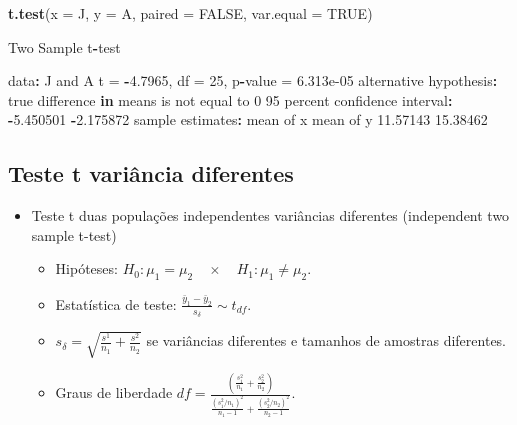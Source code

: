 \documentclass[10pt,a4paper]{book}
\newenvironment{Shaded}{\begin{snugshade}}{\end{snugshade}}
\newcommand{\KeywordTok}[1]{\textcolor[rgb]{0.13,0.29,0.53}{\textbf{#1}}}
\newcommand{\DataTypeTok}[1]{\textcolor[rgb]{0.13,0.29,0.53}{#1}}
\newcommand{\DecValTok}[1]{\textcolor[rgb]{0.00,0.00,0.81}{#1}}
\newcommand{\FloatTok}[1]{\textcolor[rgb]{0.00,0.00,0.81}{#1}}
\newcommand{\StringTok}[1]{\textcolor[rgb]{0.31,0.60,0.02}{#1}}
\newcommand{\OtherTok}[1]{\textcolor[rgb]{0.56,0.35,0.01}{#1}}
\newcommand{\ControlFlowTok}[1]{\textcolor[rgb]{0.13,0.29,0.53}{\textbf{#1}}}
\newcommand{\OperatorTok}[1]{\textcolor[rgb]{0.81,0.36,0.00}{\textbf{#1}}}
\newcommand{\NormalTok}[1]{#1}
\providecommand{\tightlist}{%
  \setlength{\itemsep}{0pt}\setlength{\parskip}{0pt}}
\begin{document}
\begin{Shaded}
\begin{Highlighting}[]
\KeywordTok{t.test}\NormalTok{(}\DataTypeTok{x =}\NormalTok{ J, }\DataTypeTok{y =}\NormalTok{ A, }\DataTypeTok{paired =} \OtherTok{FALSE}\NormalTok{, }\DataTypeTok{var.equal =} \OtherTok{TRUE}\NormalTok{)}

\NormalTok{    Two Sample t}\OperatorTok{-}\NormalTok{test}

\NormalTok{data}\OperatorTok{:}\StringTok{  }\NormalTok{J and A}
\NormalTok{t =}\StringTok{ }\OperatorTok{-}\FloatTok{4.7965}\NormalTok{, df =}\StringTok{ }\DecValTok{25}\NormalTok{, p}\OperatorTok{-}\NormalTok{value =}\StringTok{ }\FloatTok{6.313e-05}
\NormalTok{alternative hypothesis}\OperatorTok{:}\StringTok{ }\NormalTok{true difference }\ControlFlowTok{in}\NormalTok{ means is not equal to }\DecValTok{0}
\DecValTok{95}\NormalTok{ percent confidence interval}\OperatorTok{:}
\StringTok{ }\OperatorTok{-}\FloatTok{5.450501} \OperatorTok{-}\FloatTok{2.175872}
\NormalTok{sample estimates}\OperatorTok{:}
\NormalTok{mean of x mean of y }
 \FloatTok{11.57143}  \FloatTok{15.38462} 
\end{Highlighting}
\end{Shaded}

\subsection{Teste t variância
diferentes}\label{teste-t-variuxe2ncia-diferentes}

\begin{itemize}
\tightlist
\item
  Teste t duas populações independentes variâncias diferentes
  (independent two sample t-test)

  \begin{itemize}
  \tightlist
  \item
    Hipóteses:
    \(H_0: \mu_1 = \mu_2 \quad \times \quad H_1: \mu_1 \neq \mu_2.\)
  \item
    Estatística de teste:
    \(\frac{\bar{y}_1 - \bar{y}_2}{s_{\delta}} \sim t_{df}.\)
  \item
    \(s_{\delta} = \sqrt{\frac{s^1}{n_1} + \frac{s^2}{n_2}}\) se
    variâncias diferentes e tamanhos de amostras diferentes.
  \item
    Graus de liberdade
    \(df = \frac{\left ( \frac{s^2_1}{n_1} + \frac{s^2_2}{n_2} \right )}{\frac{(s^2_1/n_1)^2}{n_1 - 1} + \frac{(s^2_2/n_2)^2}{n_2 - 1}}.\)
  \end{itemize}
\end{itemize}
\end{document}
